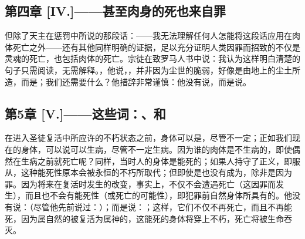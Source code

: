 
\subsection{第四章 [IV.]——甚至肉身的死也来自罪}

但除了天主在惩罚中所说的那段话：——我无法理解任何人怎能将这段话应用在肉体死亡之外——还有其他同样明确的证据，足以充分证明人类因罪而招致的不仅是灵魂的死亡，也包括肉体的死亡。宗徒在致罗马人书中说：我认为这样明白清楚的句子只需阅读，无需解释。，他说，，并非因为尘世的脆弱，好像是由地上的尘土所造，而是；我们还需要什么？他措辞非常谨慎：他没有说，而是说。\par


\subsection{第5章 [V.]——这些词：、和}

在进入圣徒复活中所应许的不朽状态之前，身体可以是，尽管不一定；正如我们现在的身体，可以说可以生病，尽管不一定生病。因为谁的肉体是不生病的，即使偶然在生病之前就死亡呢？同样，当时人的身体是能死的；如果人持守了正义，即服从，这种能死性原本会被永恒的不朽所取代；但即使是也没有成为，除非是因为罪。因为将来在复活时发生的改变，事实上，不仅不会遭遇死亡（这因罪而发生），而且也不会有能死性（或死亡的可能性），即犯罪前自然身体所具有的。他没有说：（尽管他先前说过：）；而是说：；这样，它们不仅不再死亡，而且不再能死，因为属自然的被复活为属神的，这能死的身体将穿上不朽，死亡将被生命吞灭。\par


